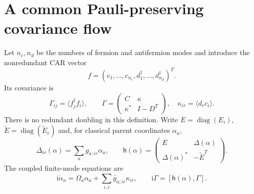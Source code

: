 \documentclass[11pt,a4paper,oneside]{book}
\theoremstyle{plain}
\theoremstyle{definition}
\theoremstyle{remark}
\newcommand{\ii}{\mathrm i}
\newcommand{\diag}{\operatorname{diag}}
\begin{document}
\section{A common Pauli-preserving covariance flow}
\label{sec:pauli-covariance-flow}
Let $n_c,n_d$ be the numbers of fermion and antifermion modes and
introduce the nonredundant CAR vector
\begin{equation}
 f=(c_1,\ldots,c_{n_c},d_1^\dagger,\ldots,d_{n_d}^\dagger)^T.
 \label{eq:particle-hole-car-vector}
\end{equation}
Its covariance is
\begin{equation}
 \Gamma_{ij}=\langle f_j^\dagger f_i\rangle,\qquad
 \Gamma=\begin{pmatrix}C&\kappa\\\kappa^*&I-D^T\end{pmatrix},
 \quad \kappa_{ir}=\langle d_rc_i\rangle.
 \label{eq:full-particle-hole-covariance}
\end{equation}
There is no redundant doubling in this definition.  Write
$E=\diag(E_i)$, $\widetilde E=\diag(\widetilde E_r)$ and, for
classical parent coordinates $\alpha_a$,
\begin{equation}
 \Delta_{ir}(\alpha)=\sum_a g_{a;ir}\alpha_a,\qquad
 \mathsf h(\alpha)=
 \begin{pmatrix}E&\Delta(\alpha)\\\Delta(\alpha)^*&-\widetilde E^T\end{pmatrix}.
 \label{eq:covariance-one-body-hamiltonian}
\end{equation}
The coupled finite-mode equations are
\begin{equation}
 \ii\dot\alpha_a=\Omega_a\alpha_a+
                    \sum_{i,r}\bar g_{a;ir}\kappa_{ir},\qquad
 \ii\dot\Gamma=[\mathsf h(\alpha),\Gamma].
 \label{eq:pauli-covariance-flow}
\end{equation}
\end{document}
